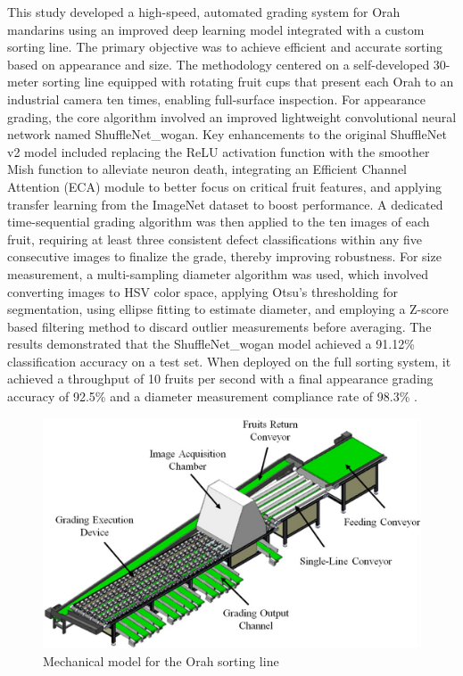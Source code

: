 {This study developed a high-speed, automated grading system for Orah mandarins using an improved deep learning model integrated with a custom sorting line. The primary objective was to achieve efficient and accurate sorting based on appearance and size. The methodology centered on a self-developed 30-meter sorting line equipped with rotating fruit cups that present each Orah to an industrial camera ten times, enabling full-surface inspection. For appearance grading, the core algorithm involved an improved lightweight convolutional neural network named ShuffleNet\_wogan. Key enhancements to the original ShuffleNet v2 model included replacing the ReLU activation function with the smoother Mish function to alleviate neuron death, integrating an Efficient Channel Attention (ECA) module to better focus on critical fruit features, and applying transfer learning from the ImageNet dataset to boost performance. A dedicated time-sequential grading algorithm was then applied to the ten images of each fruit, requiring at least three consistent defect classifications within any five consecutive images to finalize the grade, thereby improving robustness. For size measurement, a multi-sampling diameter algorithm was used, which involved converting images to HSV color space, applying Otsu’s thresholding for segmentation, using ellipse fitting to estimate diameter, and employing a Z-score based filtering method to discard outlier measurements before averaging. The results demonstrated that the ShuffleNet\_wogan model achieved a 91.12\% classification accuracy on a test set. When deployed on the full sorting system, it achieved a throughput of 10 fruits per second with a final appearance grading accuracy of 92.5\% and a diameter measurement compliance rate of 98.3\% \citep{bu2025grading}.

\begin{figure}[ht]
	\centering
	\includegraphics[width=0.7\linewidth]{figures/Bu2025}
	\caption{Mechanical model for the Orah sorting line \citep{bu2025grading}}
	\label{fig:Bu2025}
\end{figure}

}
